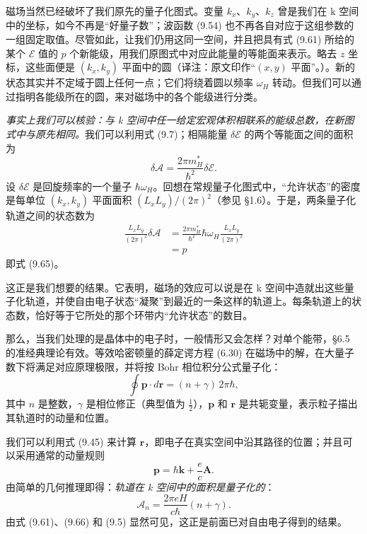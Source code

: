 磁场当然已经破坏了我们原先的量子化图式。变量 $k_{x}$、$k_{y}$、$k_{z}$ 曾是我们在 k 空间中的坐标，如今不再是“好量子数”；波函数 (9.54) 也不再各自对应于这组参数的一组固定取值。尽管如此，让我们仍用这同一空间，并且把具有式 (9.61) 所给的某个 $\mathcal{E}$ 值的 $p$ 个新能级，用我们原图式中对应此能量的等能面来表示。略去 $z$ 坐标，这些面便是 $(k_{x},k_{y})$ 平面中的圆（译注：原文印作“$(x,y)$ 平面”。）。新的状态其实并不定域于圆上任何一点；它们将绕着圆以频率 $\omega_{H}$ 转动。但我们可以通过指明各能级所在的圆，来对磁场中的各个能级进行分类。


\emph{事实上我们可以核验：与 k 空间中任一给定宏观体积相联系的能级总数，在新图式中与原先相同。}我们可以利用式 (9.7)；相隔能量 $\delta\mathcal{E}$ 的两个等能面之间的面积为
\begin{equation*}
\delta\mathcal{A}=\frac{2\pi m_{H}^{*}}{\hbar^{2}}\delta\mathcal{E}.
\tag{9.66}
\end{equation*}
设 $\delta\mathcal{E}$ 是回旋频率的一个量子 $\hbar\omega_{H}$。回想在常规量子化图式中，“允许状态”的密度是每单位 $(k_{x},k_{y})$ 平面面积 $(L_{x}L_{y})/(2\pi)^{2}$（参见 §1.6）。于是，两条量子化轨道之间的状态数为
\begin{align*}
\frac{L_{x}L_{y}}{(2\pi)^{2}}\delta\mathcal{A}&=\frac{2\pi m_{H}^{*}}{\hbar^{2}}\hbar\omega_{H}\frac{L_{x}L_{y}}{(2\pi)^{2}}\\
&=p
\tag{9.67}
\end{align*}
即式 (9.65)。

这正是我们想要的结果。它表明，磁场的效应可以说是在 k 空间中造就出这些量子化轨道，并使自由电子状态“凝聚”到最近的一条这样的轨道上。每条轨道上的状态数，恰好等于它所处的那个环带内“允许状态”的数目。

那么，当我们处理的是晶体中的电子时，一般情形又会怎样？对单个能带，§6.5 的准经典理论有效。等效哈密顿量的薛定谔方程 (6.30) 在磁场中的解，在大量子数下将满足对应原理极限，并将按 Bohr 相位积分公式量子化：
\begin{equation*}
\oint\mathbf{p}\cdot d\mathbf{r}=(n+\gamma)\,2\pi\hbar,
\tag{9.68}
\end{equation*}
其中 $n$ 是整数，$\gamma$ 是相位修正（典型值为 $\frac{1}{2}$），$\mathbf{p}$ 和 $\mathbf{r}$ 是共轭变量，表示粒子描出其轨道时的动量和位置。

我们可以利用式 (9.45) 来计算 $\mathbf{r}$，即电子在真实空间中沿其路径的位置；并且可以采用通常的动量规则
\begin{equation*}
\mathbf{p}=\hbar\mathbf{k}+\frac{e}{c}\mathbf{A}.
\tag{9.69}
\end{equation*}
由简单的几何推理即得：\emph{轨道在 k 空间中的面积是量子化的}：
\begin{equation*}
\mathcal{A}_{n}=\frac{2\pi eH}{c\hbar}(n+\gamma).
\tag{9.70}
\end{equation*}
由式 (9.61)、(9.66) 和 (9.5) 显然可见，这正是前面已对自由电子得到的结果。

